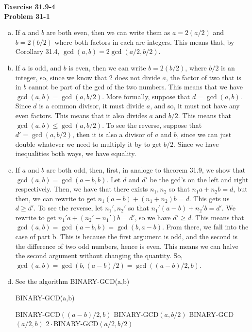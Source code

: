 \documentclass{article}
\begin{document}
\noindent\textbf{Exercise 31.9-4}\\


\noindent\textbf{Problem 31-1}\\

\begin{enumerate}[a.]
\item If $a$ and $b$ are both even, then we can write them as $a = 2 (a/2)$ and $b=2(b/2)$ where both factors in each are integers. This means that, by Corollary 31.4, $\gcd(a,b) = 2 \gcd(a/2,b/2)$.
\item If $a$ is odd, and $b$ is even, then we can write $b = 2 (b/2)$, where $b/2$ is an integer, so, since we know that 2 does not divide $a$, the factor of two that is in $b$ cannot be part of the gcd of the two numbers. This means that we have $\gcd(a,b) = \gcd(a,b/2)$. More formally, suppose that $d= \gcd(a,b)$. Since $d$ is a common divisor, it must divide $a$, and so, it must not have any even factors. This means that it also divides $a$ and $b/2$. This means that $\gcd(a,b) \le \gcd(a,b/2)$. To see the reverse, suppose that $d' = \gcd(a,b/2)$, then it is also a divisor of $a$ and $b$, since we can just double whatever we need to multiply it by to get $b/2$. Since we have inequalities both ways, we have equality.
\item
If $a$ and $b$ are both odd, then, first, in analoge to theorem 31.9, we show that $\gcd(a,b) = \gcd(a-b,b)$. Let $d$ and $d'$ be the gcd's on the left and right respectively. Then, we have that there exists $n_1,n_2$ so that $n_1 a + n_2 b = d$, but then, we can rewrite to get $n_1( a- b) + (n_1+n_2)b = d$. This gets us $d \ge d'$. To see the reverse, let $n_1',n_2'$ so that $n_1' (a-b) + n_2' b = d'$. We rewrite to get $n_1' a + (n_2' - n_1') b = d'$, so we have $d'\ge d$. This means that $\gcd(a,b) = \gcd(a-b,b) = \gcd(b,a-b)$. From there, we fall into the case of part b. This is because the first argument is odd, and the second is the difference of two odd numbers, hence is even. This means we can halve the second argument without changing the quantity. So, $\gcd(a,b) = \gcd(b, (a-b)/2) =\gcd((a-b)/2,b)$.
\item
See the algorithm BINARY-GCD(a,b)

\begin{algorithm}
\caption{BINARY-GCD(a,b)}
\begin{algorithmic}
\State \Return BINARY-GCD$((a-b)/2,b)$
\Else
\State \Return BINARY-GCD$(a,b/2)$
\EndIf
\Else
{}
\State \Return BINARY-GCD$(a/2,b)$
\Else
\State \Return $2\cdot $BINARY-GCD$(a/2,b/2)$
\EndIf
\EndIf
\end{algorithmic}
\end{algorithm}
\end{enumerate}
\end{document}

